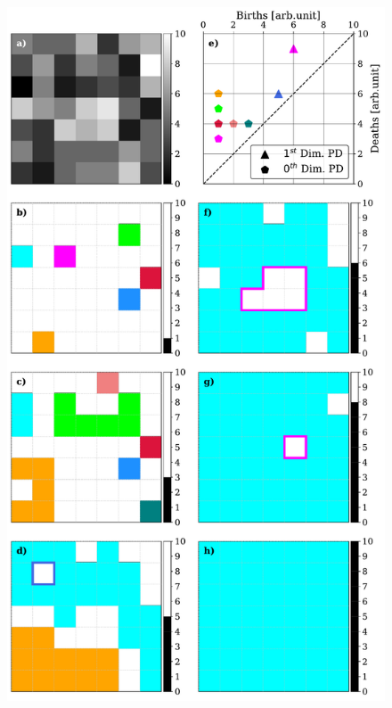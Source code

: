 \begin{figure}
    \begin{minipage}[c]{0.67\textwidth}
      \includegraphics[width=\textwidth]{figures/PersistentHomology/ImageFiltering_example_v.pdf}
    \end{minipage}\hfill
    \begin{minipage}[c]{0.3\textwidth}
      \caption[Grayscale image sublevel filtration example.]{
}
\end{minipage}
\end{figure}
